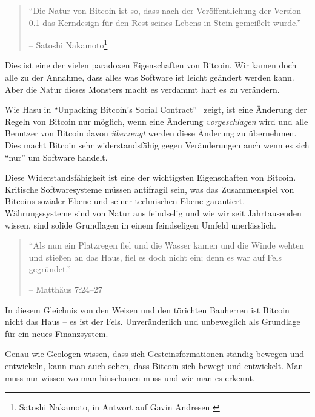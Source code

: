 \begin{quotation}\begin{samepage}
\enquote{Die Natur von Bitcoin ist so, dass nach der Veröffentlichung der
Version 0.1 das Kerndesign für den Rest seines Lebens in Stein gemeißelt wurde.}
\begin{flushright} -- Satoshi Nakamoto\footnote{Satoshi Nakamoto, in  Antwort
auf Gavin Andresen \cite{satoshi-centralized-nature}}
\end{flushright}\end{samepage}\end{quotation}

Dies ist eine der vielen paradoxen Eigenschaften von Bitcoin. Wir kamen doch
alle zu der Annahme, dass alles was Software ist leicht geändert werden kann.
Aber die Natur dieses Monsters macht es verdammt hart es zu verändern.

Wie Hasu in \enquote{Unpacking Bitcoin’s Social Contract}~\cite{social-contract}
zeigt, ist eine Änderung der Regeln von Bitcoin nur möglich, wenn eine Änderung
\textit{vorgeschlagen} wird und alle Benutzer von Bitcoin davon
\textit{überzeugt} werden diese Änderung zu übernehmen. Dies macht Bitcoin sehr
widerstandsfähig gegen Veränderungen auch wenn es sich \enquote{nur} um Software
handelt.

Diese Widerstandsfähigkeit ist eine der wichtigsten Eigenschaften von Bitcoin.
Kritische Softwaresysteme müssen antifragil sein, was das Zusammenspiel von
Bitcoins sozialer Ebene und seiner technischen Ebene garantiert. Währungssysteme
sind von Natur aus feindselig und wie wir seit Jahrtausenden wissen, sind solide
Grundlagen in einem feindseligen Umfeld unerlässlich.

\begin{quotation}\begin{samepage}
\enquote{Als nun ein Platzregen fiel und die Wasser kamen und die Winde wehten
und stießen an das Haus, fiel es doch nicht ein; denn es war auf Fels
gegründet.}
\begin{flushright} -- Matthäus 7:24--27
\end{flushright}\end{samepage}\end{quotation}

In diesem Gleichnis von den Weisen und den törichten Bauherren ist Bitcoin nicht
das Haus -- es ist der Fels. Unveränderlich und unbeweglich als Grundlage für
ein neues Finanzsystem.

Genau wie Geologen wissen, dass sich Gesteinsformationen ständig bewegen und
entwickeln, kann man auch sehen, dass Bitcoin sich bewegt und entwickelt.
Man muss nur wissen wo man hinschauen muss und wie man es erkennt.

